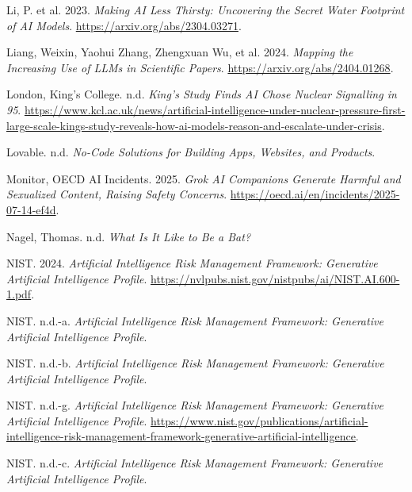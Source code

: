 \documentclass[
  10pt,
  a4paper,
  DIV=11,
  numbers=noendperiod,
  oneside]{scrreprt}
\newlength{\cslhangindent}
\newenvironment{CSLReferences}[2] %
 {\begin{list}{}{%
  \setlength{\itemindent}{0pt}
  \setlength{\leftmargin}{0pt}
  \setlength{\parsep}{0pt}
  \ifodd #1
   \setlength{\leftmargin}{\cslhangindent}
   \setlength{\itemindent}{-1\cslhangindent}
  \fi
  \setlength{\itemsep}{#2\baselineskip}}}
 {\end{list}}
\let\oldemph\emph
\renewcommand{\emph}[1]{\oldemph{\textcolor{cmmgray}{#1}}}
\begin{document}
\begin{CSLReferences}{1}{1}
Li, P. et al. 2023. \emph{Making AI Less Thirsty: Uncovering the Secret
Water Footprint of AI Models}. \url{https://arxiv.org/abs/2304.03271}.

Liang, Weixin, Yaohui Zhang, Zhengxuan Wu, et al. 2024. \emph{Mapping
the Increasing Use of LLMs in Scientific Papers}.
\url{https://arxiv.org/abs/2404.01268}.

London, King's College. n.d. \emph{King's Study Finds AI Chose Nuclear
Signalling in 95}.
\url{https://www.kcl.ac.uk/news/artificial-intelligence-under-nuclear-pressure-first-large-scale-kings-study-reveals-how-ai-models-reason-and-escalate-under-crisis}.

Lovable. n.d. \emph{No-Code Solutions for Building Apps, Websites, and
Products}.

Monitor, OECD AI Incidents. 2025. \emph{Grok AI Companions Generate
Harmful and Sexualized Content, Raising Safety Concerns}.
\url{https://oecd.ai/en/incidents/2025-07-14-ef4d}.

Nagel, Thomas. n.d. \emph{What Is It Like to Be a Bat?}

NIST. 2024. \emph{Artificial Intelligence Risk Management Framework:
Generative Artificial Intelligence Profile}.
\url{https://nvlpubs.nist.gov/nistpubs/ai/NIST.AI.600-1.pdf}.

NIST. n.d.-a. \emph{Artificial Intelligence Risk Management Framework:
Generative Artificial Intelligence Profile}.

NIST. n.d.-b. \emph{Artificial Intelligence Risk Management Framework:
Generative Artificial Intelligence Profile}.

NIST. n.d.-g. \emph{Artificial Intelligence Risk Management Framework:
Generative Artificial Intelligence Profile}.
\url{https://www.nist.gov/publications/artificial-intelligence-risk-management-framework-generative-artificial-intelligence}.

NIST. n.d.-c. \emph{Artificial Intelligence Risk Management Framework:
Generative Artificial Intelligence Profile}.


\end{CSLReferences}
\end{document}
